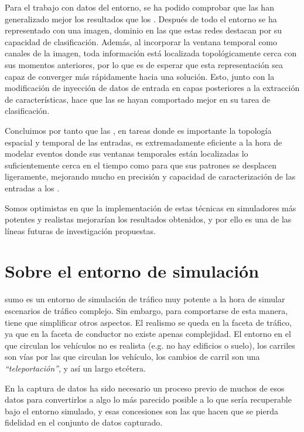 Para el trabajo con datos del entorno, se ha podido comprobar que las  han generalizado mejor los resultados que los . Después de todo el entorno se ha representado con una imagen, dominio en las que estas redes destacan por su capacidad de clasificación. Además, al incorporar la ventana temporal como canales de la imagen, toda información está localizada topológicamente cerca con sus momentos anteriores, por lo que es de esperar que esta representación sea capaz de converger más rápidamente hacia una solución. Esto, junto con la modificación de inyección de datos de entrada en capas posteriores a la extracción de características, hace que las  se hayan comportado mejor en su tarea de clasificación.

Concluimos por tanto que las , en tareas donde es importante la topología espacial y temporal de las entradas, es extremadamente eficiente a la hora de modelar eventos donde sus ventanas temporales están localizadas lo suficientemente cerca en el tiempo como para que sus patrones se desplacen ligeramente, mejorando mucho en precisión y capacidad de caracterización de las entradas a los .

Somos optimistas en que la implementación de estas técnicas en simuladores más potentes y realistas mejorarían los resultados obtenidos, y por ello es una de las líneas futuras de investigación propuestas.

\section{Sobre el entorno de simulación}

\gls{sumo} es un entorno de simulación de tráfico muy potente a la hora de simular escenarios de tráfico complejo. Sin embargo, para comportarse de esta manera, tiene que simplificar otros aspectos. El realismo se queda en la faceta de tráfico, ya que en la faceta de conductor no existe apenas complejidad. El entorno en el que circulan los vehículos no es realista (e.g. no hay edificios o suelo), los carriles son vías por las que circulan los vehículo, los cambios de carril son una \textit{\enquote{teleportación}}, y así un largo etcétera.

En la captura de datos ha sido necesario un proceso previo de muchos de esos datos para convertirlos a algo lo más parecido posible a lo que sería recuperable bajo el entorno simulado, y esas concesiones son las que hacen que se pierda fidelidad en el conjunto de datos capturado.

